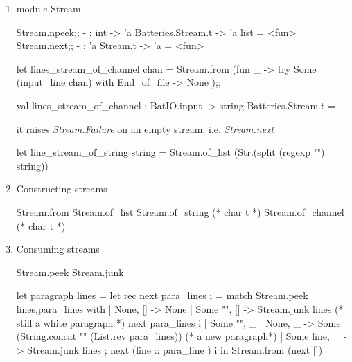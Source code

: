 \begin{enumerate}
\begin{redcode}
   \end{redcode}
   

\item module Stream


\begin{alternate}
Stream.npeek;;
- : int -> 'a Batteries.Stream.t -> 'a list = <fun>
Stream.next;;
- : 'a Stream.t -> 'a = <fun>
\end{alternate}



\begin{redcode}
let lines_stream_of_channel chan = Stream.from (fun _ -> 
    try Some (input_line chan) with End_of_file -> None );;
\end{redcode}

\begin{bluecode}  
val lines_stream_of_channel : BatIO.input -> string Batteries.Stream.t =
\end{bluecode}


it raises \textit{Stream.Failure} on an empty stream,
i.e. \textit{Stream.next}

\begin{redcode}
let line_stream_of_string string =
  Stream.of_list (Str.(split (regexp "\n") string))
\end{redcode}

\item Constructing streams \\
  \begin{bluetext}
    Stream.from
    Stream.of_list
    Stream.of_string (* char t *)
    Stream.of_channel (* char t *)
  \end{bluetext}

\item Consuming streams \\

\begin{bluetext}
   Stream.peek
   Stream.junk
\end{bluetext}

\begin{bluecode}
let paragraph lines =
  let rec next para_lines i =
    match Stream.peek lines,para_lines with
    | None, [] -> None
    | Some "", [] ->
      Stream.junk lines (* still a white paragraph *)
      next para_lines i
    | Some "", _ | None, _ ->
      Some (String.concat "\n" (List.rev para_lines)) (* a new paragraph*)
    | Some line, _ ->
      Stream.junk lines ;
      next (line :: para_line ) i in
  Stream.from (next [])    
\end{bluecode}


\end{enumerate}
